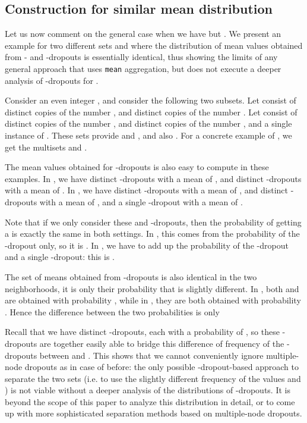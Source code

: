 \documentclass{article}
\begin{document}
\subsection{Construction for similar mean distribution}

Let us now comment on the general case when we have  but . We present an example for two different sets  and  where the distribution of mean values obtained from - and -dropouts is essentially identical, thus showing the limits of any general approach that uses \texttt{mean} aggregation, but does not execute a deeper analysis of -dropouts for .

Consider an even integer , and consider the following two subsets. Let  consist of  distinct copies of the number , and  distinct copies of the number . Let  consist of  distinct copies of the number , and  distinct copies of the number , and a single instance of . These sets provide  and , and also . For a concrete example of , we get the multisets  and .

The mean values obtained for -dropouts is also easy to compute in these examples. In , we have  distinct -dropouts with a mean of , and  distinct -dropouts with a mean of . In , we have  distinct -dropouts with a mean of , and  distinct -dropouts with a mean of , and a single -dropout with a mean of .

Note that if we only consider these  and -dropouts, then the probability of getting a  is exactly the same in both settings. In , this comes from the probability of the -dropout only, so it is . In , we have to add up the probability of the -dropout and a single -dropout: this is .

The set of means obtained from -dropouts is also identical in the two neighborhoods, it is only their probability that is slightly different. In , both  and  are obtained with probability , while in , they are both obtained with probability . Hence the difference between the two probabilities is only

Recall that we have  distinct -dropouts, each with a probability of , so these -dropouts are together easily able to bridge this difference of frequency of the -dropouts between  and . This shows that we cannot conveniently ignore multiple-node dropouts as in case of  before: the only possible -dropout-based approach to separate the two sets (i.e. to use the slightly different frequency of the values  and ) is not viable without a deeper analysis of the distributions of -dropouts. It is beyond the scope of this paper to analyze this distribution in detail, or to come up with more sophisticated separation methods based on multiple-node dropouts.
\end{document}
